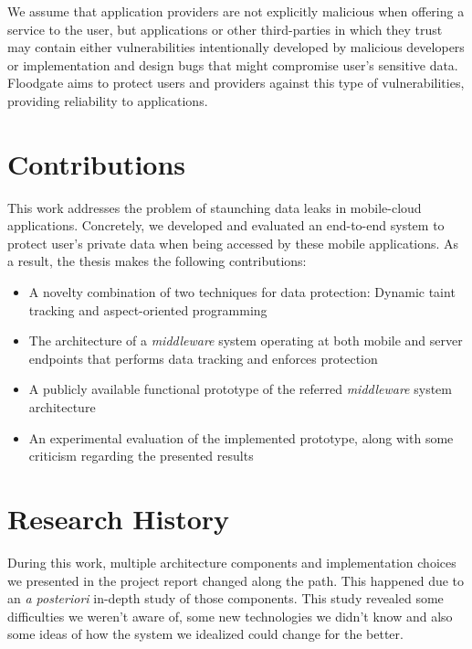 We assume that application providers are not explicitly malicious when offering a service to the user, but applications or other third-parties in which they trust may contain either vulnerabilities intentionally developed by malicious developers or implementation and design bugs that might compromise user's sensitive data. Floodgate aims to protect users and providers against this type of vulnerabilities, providing reliability to applications.

\section{Contributions}

This work addresses the problem of staunching data leaks in mobile-cloud applications. Concretely, we developed and evaluated an end-to-end system to protect user's private data when being accessed by these mobile applications. As a result, the thesis makes the following contributions:

\begin{itemize}

\item A novelty combination of two techniques for data protection: Dynamic taint tracking and aspect-oriented programming

\item The architecture of a \textit{middleware} system operating at both mobile and server endpoints that performs data tracking and enforces protection

\item A publicly available functional prototype of the referred \textit{middleware} system architecture

\item An experimental evaluation of the implemented prototype, along with some criticism regarding the presented results

\end{itemize}
 
\section{Research History}

During this work, multiple architecture components and implementation choices we presented in the project report changed along the path. This happened due to an \textit{a posteriori} in-depth study of those components. This study revealed some difficulties we weren't aware of, some new technologies we didn't know and also some ideas of how the system we idealized could change for the better. 

